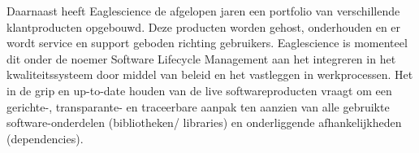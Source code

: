 Daarnaast heeft Eaglescience de afgelopen jaren een portfolio van verschillende klantproducten opgebouwd. Deze producten worden gehost, onderhouden en er wordt service en support geboden richting gebruikers. Eaglescience is momenteel dit onder de noemer Software Lifecycle Management aan het integreren in het kwaliteitssysteem door middel van beleid en het vastleggen in werkprocessen. Het in de grip en up-to-date houden van de live softwareproducten vraagt om een gerichte-, transparante- en traceerbare aanpak ten aanzien van alle gebruikte software-onderdelen (bibliotheken/ libraries) en onderliggende afhankelijkheden (dependencies).



